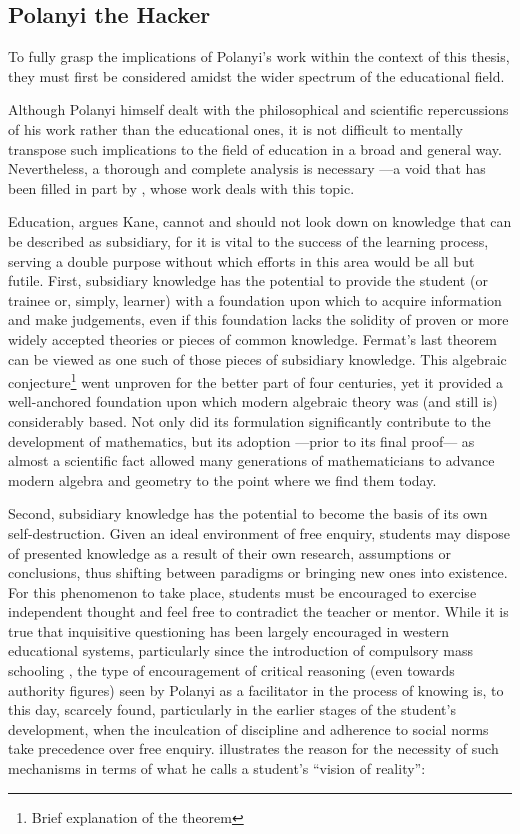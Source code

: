 \subsection{Polanyi the Hacker}

To fully grasp the implications of Polanyi's work within the context of this thesis, they must first be considered amidst the wider spectrum of the educational field. 

Although Polanyi himself dealt with the philosophical and scientific repercussions of his work rather than the educational ones, it is not difficult to mentally transpose such implications to the field of education in a broad and general way. Nevertheless, a thorough and complete analysis is necessary ---a void that has been filled in part by \citet{kane84}, whose work deals with this topic.

Education, argues Kane, cannot and should not look down on knowledge that can be described as subsidiary, for it is vital to the success of the learning process, serving a double purpose without which efforts in this area would be all but futile. First, subsidiary knowledge has the potential to provide the student (or trainee or, simply, learner) with a foundation upon which to acquire information and make judgements, even if this foundation lacks the solidity of proven or more widely accepted theories or pieces of common knowledge. Fermat's last theorem can be viewed as one such of those pieces of subsidiary knowledge. This algebraic conjecture\footnote{Brief explanation of the theorem} went unproven for the better part of four centuries, yet it provided a well-anchored foundation upon which modern algebraic theory was (and still is) considerably based. Not only did its formulation significantly contribute to the development of mathematics, but its adoption ---prior to its final proof--- as almost a scientific fact allowed many generations of mathematicians to advance modern algebra and geometry to the point where we find them today.

Second, subsidiary knowledge has the potential to become the basis of its own self-destruction. Given an ideal environment of free enquiry, students may dispose of presented knowledge as a result of their own research, assumptions or conclusions, thus shifting between paradigms or bringing new ones into existence. For this phenomenon to take place, students must be encouraged to exercise independent thought and feel free to contradict the teacher or mentor. While it is true that inquisitive questioning has been largely encouraged in western educational systems, particularly since the introduction of compulsory mass schooling \citep{dillon88}, the type of encouragement of critical reasoning (even towards authority figures) seen by Polanyi as a facilitator in the process of knowing is, to this day, scarcely found, particularly in the earlier stages of the student's development, when the inculcation of discipline and adherence to social norms take precedence over free enquiry. \citet[p.239]{kane84} illustrates the reason for the necessity of such mechanisms in terms of what he calls a student's ``vision of reality'':

